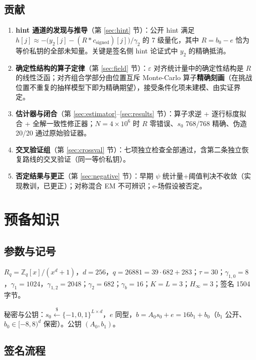 \documentclass[11pt,a4paper]{ctexart}
\newcommand{\Z}{\mathbb{Z}}
\begin{document}
\subsection{贡献}

\begin{enumerate}
\item \textbf{hint 通道的发现与推导}（第 \ref{sec:hint} 节）：公开 hint 满足 $h[j] \approx -\bigl(y_2[j] - (R * c_{\mathrm{signed}})[j]\bigr)/\gamma_2$ 的 7 级量化，其中 $R = b_0 - e$ 恰为等价私钥的全部未知量。关键是签名侧 hint 论证式中 $y_2$ 的精确抵消。
\item \textbf{确定性结构的算子定律}（第 \ref{sec:field} 节）：$\varepsilon$ 对齐统计量中的确定性结构是 $R$ 的线性泛函；对齐组合学部分由位置互斥 Monte-Carlo 算子\textbf{精确刻画}（在挑战位置不重复的抽样模型下即为精确期望），接受条件化项未建模、由实证界定。
\item \textbf{估计器与闭合}（第 \ref{sec:estimator}--\ref{sec:results} 节）：算子求逆 + 逐行标度拟合 + 全解一致性修正器；$N=4\times10^6$ 时 $R$ 零错误、$s_0$ 768/768 精确、伪造 20/20 通过原始验证器。
\item \textbf{交叉验证组}（第 \ref{sec:crossval} 节）：七项独立检查全部通过，含第二条独立恢复路线的交叉验证（同一等价私钥）。
\item \textbf{否定结果与更正}（第 \ref{sec:negative} 节）：早期 $\psi$ 统计量+阈值判决不收敛（实现教训，已更正）；对称混合 EM 不可辨识；e-场假设被否定。
\end{enumerate}

\section{预备知识}\label{sec:prelim}

\subsection{参数与记号}

$R_q = \Z_q[x]/(x^d+1)$，$d=256$，$q=26881=39\cdot682+283$；$\tau=30$；$\gamma_{1,0}=8$，$\gamma_1=1024$，$\gamma_{1,2}=2048$；$\gamma_2=682$；$\gamma_b=16$；$K=L=3$；$H_\infty=3$；签名 1504 字节。

秘密与公钥：$s_0 \xleftarrow{\$} \{-1,0,1\}^{L\times d}$，$e$ 同型，$b = A_0 s_0 + e = 16 b_1 + b_0$（$b_1$ 公开、$b_0\in[-8,8)^d$ 保密）。公钥 $(A_0, b_1)$。

\subsection{签名流程}
\end{document}
